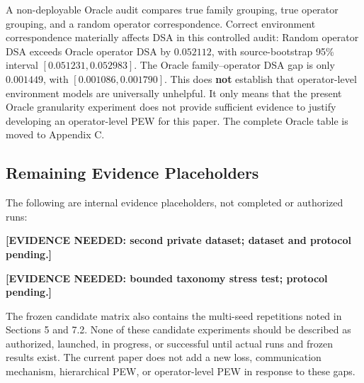 A non-deployable Oracle audit compares true family grouping, true operator grouping, and a random operator correspondence. Correct environment correspondence materially affects DSA in this controlled audit: Random operator DSA exceeds Oracle operator DSA by \(0.052112\), with source-bootstrap 95\% interval \([0.051231,0.052983]\). The Oracle family--operator DSA gap is only \(0.001449\), with \([0.001086,0.001790]\). This does \textbf{not} establish that operator-level environment models are universally unhelpful. It only means that the present Oracle granularity experiment does not provide sufficient evidence to justify developing an operator-level PEW for this paper. The complete Oracle table is moved to Appendix C.

\subsection{Remaining Evidence Placeholders}

The following are internal evidence placeholders, not completed or authorized runs:

\textbf{[EVIDENCE NEEDED: second private dataset; dataset and protocol pending.]}

\textbf{[EVIDENCE NEEDED: bounded taxonomy stress test; protocol pending.]}

The frozen candidate matrix also contains the multi-seed repetitions noted in Sections 5 and 7.2. None of these candidate experiments should be described as authorized, launched, in progress, or successful until actual runs and frozen results exist. The current paper does not add a new loss, communication mechanism, hierarchical PEW, or operator-level PEW in response to these gaps.
